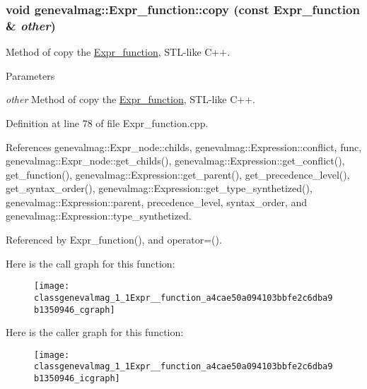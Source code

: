 \hypertarget{classgenevalmag_1_1Expr__function_a4cae50a094103bbfe2c6dba9b1350946}{
\subsubsection[{copy}]{\setlength{\rightskip}{0pt plus 5cm}void genevalmag::Expr\_\-function::copy (const {\bf Expr\_\-function} \& {\em other})}}
\label{classgenevalmag_1_1Expr__function_a4cae50a094103bbfe2c6dba9b1350946}
Method of copy the \hyperlink{classgenevalmag_1_1Expr__function}{Expr\_\-function}, STL-\/like C++. 
\begin{DoxyParams}{Parameters}
\item[{\em other}]Method of copy the \hyperlink{classgenevalmag_1_1Expr__function}{Expr\_\-function}, STL-\/like C++. \end{DoxyParams}


Definition at line 78 of file Expr\_\-function.cpp.



References genevalmag::Expr\_\-node::childs, genevalmag::Expression::conflict, func, genevalmag::Expr\_\-node::get\_\-childs(), genevalmag::Expression::get\_\-conflict(), get\_\-function(), genevalmag::Expression::get\_\-parent(), get\_\-precedence\_\-level(), get\_\-syntax\_\-order(), genevalmag::Expression::get\_\-type\_\-synthetized(), genevalmag::Expression::parent, precedence\_\-level, syntax\_\-order, and genevalmag::Expression::type\_\-synthetized.



Referenced by Expr\_\-function(), and operator=().



Here is the call graph for this function:\nopagebreak
\begin{figure}[H]
\begin{center}
\leavevmode
\texttt{[image: classgenevalmag\_1\_1Expr\_\_function\_a4cae50a094103bbfe2c6dba9b1350946\_cgraph]}
\end{center}
\end{figure}




Here is the caller graph for this function:\nopagebreak
\begin{figure}[H]
\begin{center}
\leavevmode
\texttt{[image: classgenevalmag\_1\_1Expr\_\_function\_a4cae50a094103bbfe2c6dba9b1350946\_icgraph]}
\end{center}
\end{figure}


